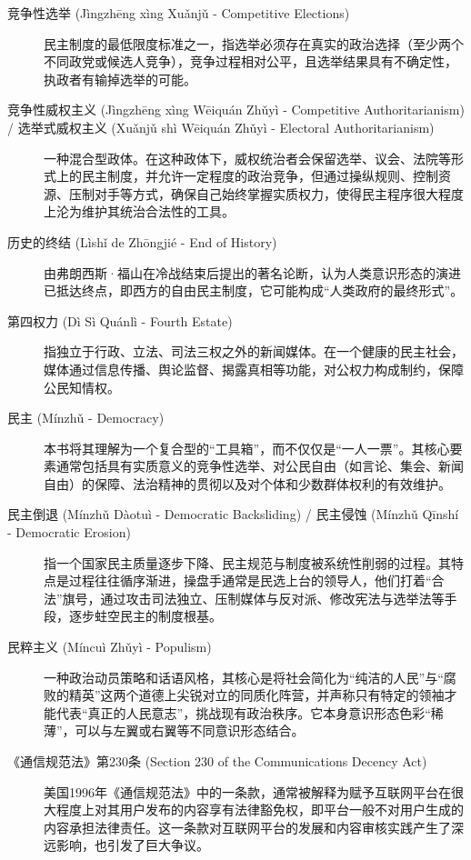 \documentclass[UTF8, 10pt]{ctexbook}
\begin{document}
\begin{description}
    \item[竞争性选举 (Jìngzhēng xìng Xuǎnjǔ - Competitive Elections)]
    民主制度的最低限度标准之一，指选举必须存在真实的政治选择（至少两个不同政党或候选人竞争），竞争过程相对公平，且选举结果具有不确定性，执政者有输掉选举的可能。

    \item[竞争性威权主义 (Jìngzhēng xìng Wēiquán Zhǔyì - Competitive Authoritarianism) / 选举式威权主义 (Xuǎnjǔ shì Wēiquán Zhǔyì - Electoral Authoritarianism)]
    一种混合型政体。在这种政体下，威权统治者会保留选举、议会、法院等形式上的民主制度，并允许一定程度的政治竞争，但通过操纵规则、控制资源、压制对手等方式，确保自己始终掌握实质权力，使得民主程序很大程度上沦为维护其统治合法性的工具。

    \item[历史的终结 (Lìshǐ de Zhōngjié - End of History)]
    由弗朗西斯·福山在冷战结束后提出的著名论断，认为人类意识形态的演进已抵达终点，即西方的自由民主制度，它可能构成“人类政府的最终形式”。

    \item[第四权力 (Dì Sì Quánlì - Fourth Estate)]
    指独立于行政、立法、司法三权之外的新闻媒体。在一个健康的民主社会，媒体通过信息传播、舆论监督、揭露真相等功能，对公权力构成制约，保障公民知情权。

    \item[民主 (Mínzhǔ - Democracy)]
    本书将其理解为一个复合型的“工具箱”，而不仅仅是“一人一票”。其核心要素通常包括具有实质意义的竞争性选举、对公民自由（如言论、集会、新闻自由）的保障、法治精神的贯彻以及对个体和少数群体权利的有效维护。

    \item[民主倒退 (Mínzhǔ Dàotuì - Democratic Backsliding) / 民主侵蚀 (Mínzhǔ Qīnshí - Democratic Erosion)]
    指一个国家民主质量逐步下降、民主规范与制度被系统性削弱的过程。其特点是过程往往循序渐进，操盘手通常是民选上台的领导人，他们打着“合法”旗号，通过攻击司法独立、压制媒体与反对派、修改宪法与选举法等手段，逐步蛀空民主的制度根基。

    \item[民粹主义 (Míncuì Zhǔyì - Populism)]
    一种政治动员策略和话语风格，其核心是将社会简化为“纯洁的人民”与“腐败的精英”这两个道德上尖锐对立的同质化阵营，并声称只有特定的领袖才能代表“真正的人民意志”，挑战现有政治秩序。它本身意识形态色彩“稀薄”，可以与左翼或右翼等不同意识形态结合。

    \item[《通信规范法》第230条 (Section 230 of the Communications Decency Act)]
    美国1996年《通信规范法》中的一条款，通常被解释为赋予互联网平台在很大程度上对其用户发布的内容享有法律豁免权，即平台一般不对用户生成的内容承担法律责任。这一条款对互联网平台的发展和内容审核实践产生了深远影响，也引发了巨大争议。


\end{description}
\end{document}
